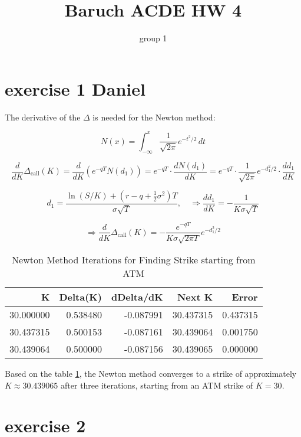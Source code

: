 \documentclass{article}
\title{Baruch ACDE HW 4}
\author{group 1}
\begin{document}
\maketitle
\tableofcontents

\section{exercise 1 Daniel}
The derivative of the $\Delta$ is needed for the Newton method:

\[
    N(x) = \int_{-\infty}^x \frac{1}{\sqrt{2\pi}} e^{-t^2/2} \, dt
\]

\[
    \frac{d}{dK} \Delta_{\text{call}}(K)
    = \frac{d}{dK} \left( e^{-qT} N(d_1) \right)
    = e^{-qT} \cdot \frac{dN(d_1)}{dK}
    = e^{-qT} \cdot \frac{1}{\sqrt{2\pi}} e^{-d_1^2/2} \cdot \frac{d d_1}{dK}
\]

\[
    d_1 = \frac{\ln(S/K) + (r - q + \frac{1}{2} \sigma^2)T}{\sigma \sqrt{T}}, \quad
    \Rightarrow \frac{d d_1}{dK} = -\frac{1}{K \sigma \sqrt{T}}
\]

\[
    \Rightarrow \frac{d}{dK} \Delta_{\text{call}}(K)
    = -\frac{e^{-qT}}{K \sigma \sqrt{2\pi T}} e^{-d_1^2/2}
\]

\begin{table}
    \centering
    \caption{Newton Method Iterations for Finding Strike starting from ATM}
    \label{tab:newton_iterations}
    \begin{tabular}{rrrrr}
        \toprule
        K         & Delta(K) & dDelta/dK & Next K    & Error    \\
        \midrule
        30.000000 & 0.538480 & -0.087991 & 30.437315 & 0.437315 \\
        30.437315 & 0.500153 & -0.087161 & 30.439064 & 0.001750 \\
        30.439064 & 0.500000 & -0.087156 & 30.439065 & 0.000000 \\
        \bottomrule
    \end{tabular}
\end{table}

Based on the table \ref{tab:newton_iterations},
the Newton method converges to a strike of approximately \( K \approx 30.439065 \)
after three iterations, starting from an ATM strike of \( K = 30 \).

\section{exercise 2}
\end{document}
